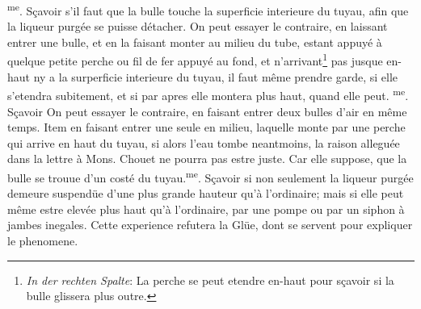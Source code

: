 \pstart {}\textsuperscript{me}. S\c{c}avoir s'il faut que la bulle touche la superficie interieure du tuyau, afin que la liqueur purg\'{e}e \protect{} se puisse d\'{e}tacher. On peut essayer le contraire, en laissant entrer une bulle, et en la faisant monter au milieu du tube, estant appuy\'{e} \`{a} quelque petite perche ou fil de fer\protect{} appuy\'{e} au fond, et n'arrivant\footnote{\textit{In der rechten Spalte}: La perche se peut etendre en-haut pour s\c{c}avoir si la bulle glissera plus outre.}  pas jusque en-haut ny a la surperficie interieure du tuyau, il faut même prendre garde, si elle s'etendra  subitement, et si par apres elle montera plus haut, quand elle peut. \pend
 \pstart  {}\textsuperscript{me}. S\c{c}avoir  On peut essayer le contraire, en faisant entrer deux bulles d'air en même temps. Item en faisant entrer une seule en milieu, laquelle monte par une perche qui arrive en haut du tuyau, si alors l'eau tombe neantmoins, la raison allegu\'{e}e dans la lettre \`{a} Mons. Chouet\protect{} ne pourra pas estre juste. Car elle suppose, que la bulle se trouue d'un cost\'{e} du tuyau.\pend \pstart {}\textsuperscript{me}. S\c{c}avoir si non seulement la liqueur\protect{} purg\'{e}e demeure suspend\"{u}e d'une plus grande hauteur qu'\`{a} l'ordinaire; mais si elle peut même estre elev\'{e}e plus haut qu'\`{a} l'ordinaire, par une pompe\protect{} ou par un siphon \`{a} jambes inegales. Cette experience refutera la Gl\"{u}e, dont  se servent pour expliquer le phenomene.  \pend 